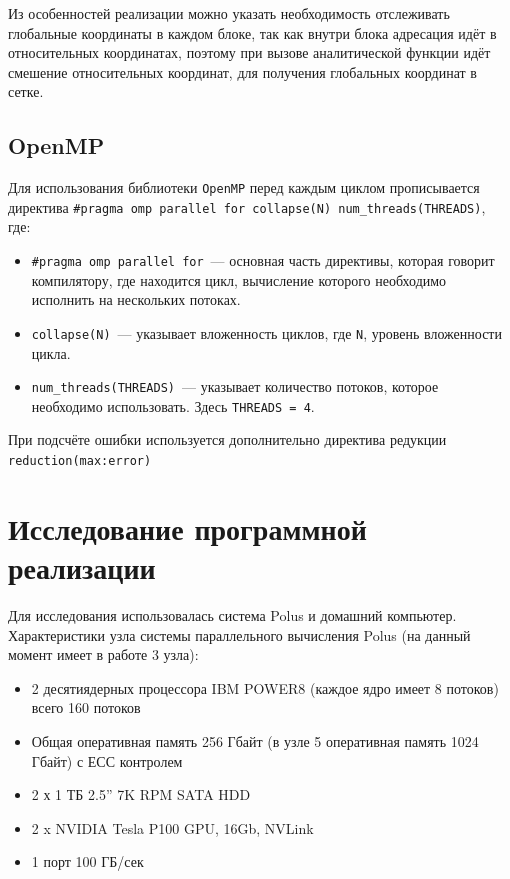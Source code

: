 \documentclass{article}
\begin{document}
    Из особенностей реализации можно указать необходимость отслеживать глобальные координаты
    в каждом блоке, так как внутри блока адресация идёт в относительных координатах,
    поэтому при вызове аналитической функции идёт смешение относительных координат, для
    получения глобальных координат в сетке.

\subsection{OpenMP}
    Для использования библиотеки {\tt OpenMP} перед каждым циклом прописывается 
    директива {\tt \#pragma omp parallel for collapse(N) num\_threads(THREADS)}, где:
    \begin{itemize}
        \item {\tt \#pragma omp parallel for}~--- основная часть директивы, которая
            говорит компилятору, где находится цикл, вычисление которого необходимо 
            исполнить на нескольких потоках.
        \item {\tt collapse(N)}~--- указывает вложенность циклов, где {\tt N}, уровень
            вложенности цикла.
        \item {\tt num\_threads(THREADS)}~--- указывает количество потоков, которое необходимо
            использовать. Здесь {\tt THREADS = 4}.
    \end{itemize}

    При подсчёте ошибки используется дополнительно директива редукции {\tt reduction(max:error)}
    
\section{Исследование программной реализации}
    Для исследования использовалась система Polus и домашний компьютер.
    Характеристики узла системы параллельного вычисления Polus (на данный момент имеет в работе 3 узла):
    \begin{itemize}
        \item 2 десятиядерных процессора IBM POWER8 (каждое ядро имеет 8 потоков) всего 160 потоков
        \item Общая оперативная память 256 Гбайт (в узле 5 оперативная память 1024 Гбайт) с ЕСС контролем
        \item 2 х 1 ТБ 2.5” 7K RPM SATA HDD
        \item 2 x NVIDIA Tesla P100 GPU, 16Gb, NVLink
        \item 1 порт 100 ГБ/сек
    \end{itemize}
\end{document}
